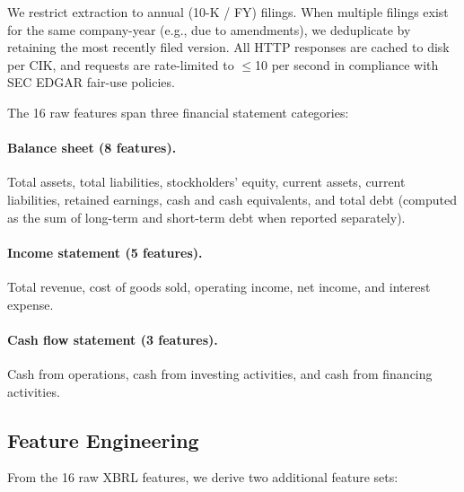 We restrict extraction to annual (10-K / FY) filings. When multiple filings exist for the same company-year (e.g., due to amendments), we deduplicate by retaining the most recently filed version. All HTTP responses are cached to disk per CIK, and requests are rate-limited to $\leq$10 per second in compliance with SEC EDGAR fair-use policies.

The 16 raw features span three financial statement categories:

\paragraph{Balance sheet (8 features).} Total assets, total liabilities, stockholders' equity, current assets, current liabilities, retained earnings, cash and cash equivalents, and total debt (computed as the sum of long-term and short-term debt when reported separately).

\paragraph{Income statement (5 features).} Total revenue, cost of goods sold, operating income, net income, and interest expense.

\paragraph{Cash flow statement (3 features).} Cash from operations, cash from investing activities, and cash from financing activities.

\subsection{Feature Engineering}
\label{sec:features}

From the 16 raw XBRL features, we derive two additional feature sets:

